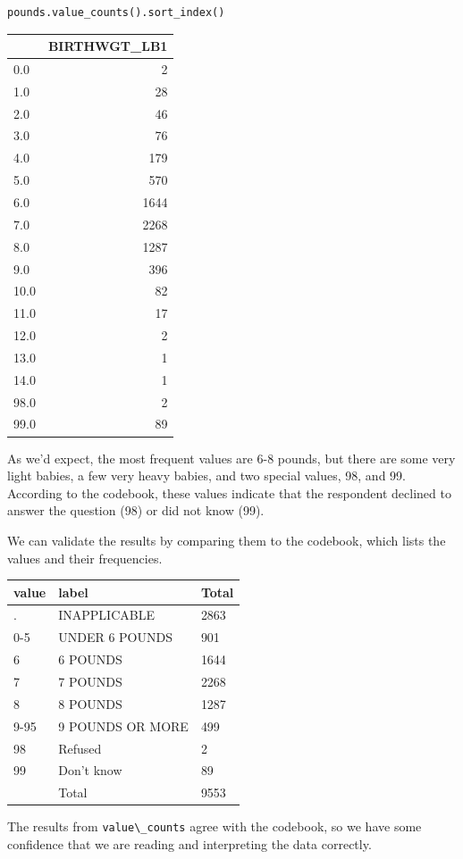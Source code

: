 \begin{lstlisting}[language=Python]
pounds.value_counts().sort_index()
\end{lstlisting}

\begin{tabular}{lr}
\toprule
{} &  BIRTHWGT\_LB1 \\
\midrule
0.0  &             2 \\
1.0  &            28 \\
2.0  &            46 \\
3.0  &            76 \\
4.0  &           179 \\
5.0  &           570 \\
6.0  &          1644 \\
7.0  &          2268 \\
8.0  &          1287 \\
9.0  &           396 \\
10.0 &            82 \\
11.0 &            17 \\
12.0 &             2 \\
13.0 &             1 \\
14.0 &             1 \\
98.0 &             2 \\
99.0 &            89 \\
\bottomrule
\end{tabular}

As we'd expect, the most frequent values are 6-8 pounds, but there are
some very light babies, a few very heavy babies, and two special values,
98, and 99. According to the codebook, these values indicate that the
respondent declined to answer the question (98) or did not know (99).

We can validate the results by comparing them to the codebook, which
lists the values and their frequencies.

\begin{longtable}[]{@{}lll@{}}
\toprule
value & label & Total\tabularnewline
\midrule
\endhead
. & INAPPLICABLE & 2863\tabularnewline
0-5 & UNDER 6 POUNDS & 901\tabularnewline
6 & 6 POUNDS & 1644\tabularnewline
7 & 7 POUNDS & 2268\tabularnewline
8 & 8 POUNDS & 1287\tabularnewline
9-95 & 9 POUNDS OR MORE & 499\tabularnewline
98 & Refused & 2\tabularnewline
99 & Don't know & 89\tabularnewline
& Total & 9553\tabularnewline
\bottomrule
\end{longtable}

The results from \passthrough{\lstinline!value\_counts!} agree with the
codebook, so we have some confidence that we are reading and
interpreting the data correctly.

